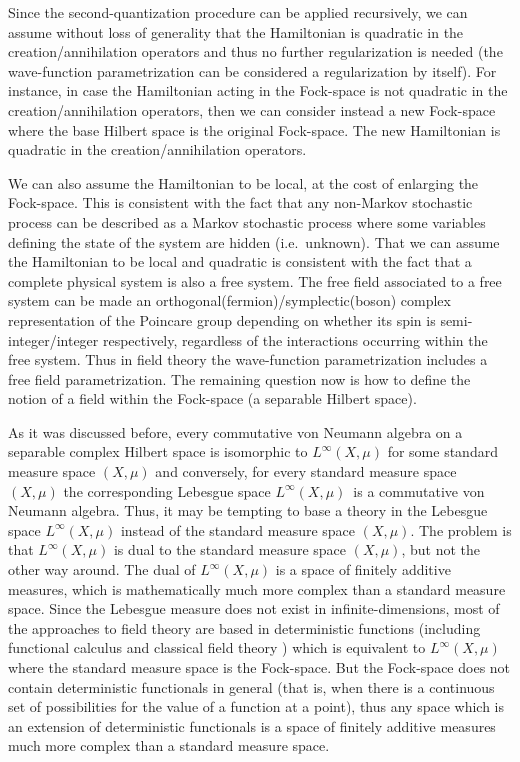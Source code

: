 \documentclass[11pt]{book}
\begin{document}
Since the second-quantization procedure can be applied recursively, we
can assume without loss of generality that the Hamiltonian is quadratic
in the creation/annihilation operators and thus no further
regularization is needed (the wave-function parametrization can be
considered a regularization by itself). For instance, in case the
Hamiltonian acting in the Fock-space is not quadratic in the
creation/annihilation operators, then we can consider instead a new
Fock-space where the base Hilbert space is the original Fock-space. The
new Hamiltonian is quadratic in the creation/annihilation operators.

We can also assume the Hamiltonian to be local, at the cost of enlarging
the Fock-space. This is consistent with the fact that any non-Markov
stochastic process can be described as a Markov stochastic process where
some variables defining the state of the system are hidden
(i.e.~unknown)\cite{Zuckerman2015Statistical}\cite{Kampen1998Remarks}. That we
can assume the Hamiltonian to be local and quadratic is consistent with
the fact that a complete physical system is also a free system. The free
field associated to a free system can be made an
orthogonal(fermion)/symplectic(boson) complex representation of the
Poincare group depending on whether its spin is semi-integer/integer
respectively, regardless of the interactions occurring within the free
system\cite{Duck1998Toward}\cite{Wigner1939On}. Thus in
field theory the wave-function parametrization includes a free field
parametrization. The remaining question now is how to define the notion
of a field within the Fock-space (a separable Hilbert space).

As it was discussed before, every commutative von Neumann algebra on a
separable complex Hilbert space is isomorphic to \(L^\infty(X,\mu)\) for
some standard measure space \((X,\mu)\) and conversely, for every
standard measure space~\((X,\mu)\) the corresponding Lebesgue space
\(L^\infty(X,\mu)\)~is a commutative von Neumann algebra. Thus, it may
be tempting to base a theory in the Lebesgue space \(L^\infty(X,\mu)\)
instead of the standard measure space \((X,\mu)\). The problem is that
\(L^\infty(X,\mu)\) is dual to the standard measure space \((X,\mu)\),
but not the other way around. The dual of \(L^\infty(X,\mu)\) is a space
of finitely additive measures\cite{book}, which is mathematically much more complex than a standard
measure space. Since the Lebesgue measure does not exist in
infinite-dimensions, most of the approaches to field theory are based in
deterministic functions (including functional calculus and classical
field theory
\cite{Sardanashvily2008Classical}) which is equivalent to \(L^\infty(X,\mu)\) where the standard
measure space is the Fock-space. But the Fock-space does not contain
deterministic functionals in general (that is, when there is a
continuous set of possibilities for the value of a function at a point),
thus any space which is an extension of deterministic functionals is a
space of finitely additive measures much more complex than a standard
measure space.
\end{document}
